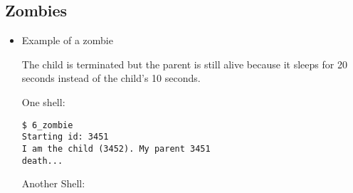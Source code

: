 \documentclass[]{article}
\newenvironment{Shaded}{}{}
\newcommand{\DataTypeTok}[1]{\textcolor[rgb]{0.56,0.13,0.00}{#1}}
\newcommand{\DecValTok}[1]{\textcolor[rgb]{0.25,0.63,0.44}{#1}}
\newcommand{\SpecialCharTok}[1]{\textcolor[rgb]{0.25,0.44,0.63}{#1}}
\newcommand{\StringTok}[1]{\textcolor[rgb]{0.25,0.44,0.63}{#1}}
\newcommand{\CommentTok}[1]{\textcolor[rgb]{0.38,0.63,0.69}{\textit{#1}}}
\newcommand{\ControlFlowTok}[1]{\textcolor[rgb]{0.00,0.44,0.13}{\textbf{#1}}}
\newcommand{\NormalTok}[1]{#1}
\begin{document}
\subsection{\texorpdfstring{\textbf{Zombies}}{Zombies}}\label{header-n244}

\begin{itemize}
\item
  Example of a zombie

\begin{Shaded}
\end{Shaded}

  The child is terminated but the parent is still alive because it
  sleeps for 20 seconds instead of the child's 10 seconds.

  One shell:

\begin{verbatim}
$ 6_zombie
Starting id: 3451
I am the child (3452). My parent 3451
death...
\end{verbatim}

  Another Shell:


\end{itemize}
\end{document}
